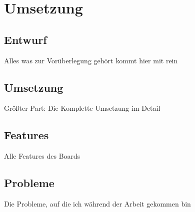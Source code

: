 \chapter{Umsetzung}\label{Bauhausboard}
\section{Entwurf}\label{Entwurf}
Alles was zur Vorüberlegung gehört kommt hier mit rein
\section{Umsetzung}\label{Umsetzung}
Größter Part: Die Komplette Umsetzung im Detail
\section{Features}\label{Features}
Alle Features des Boards
\section{Probleme}\label{Probleme}
Die Probleme, auf die ich während der Arbeit gekommen bin